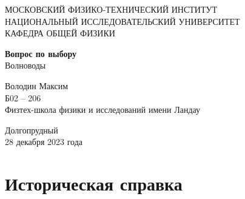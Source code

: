 \documentclass[a4paper, 14pt]{article}
\begin{document}
    \begin{titlepage}
        \begin{center}
        {\large МОСКОВСКИЙ ФИЗИКО-ТЕХНИЧЕСКИЙ ИНСТИТУТ \\ \vspace{5mm}
        НАЦИОНАЛЬНЫЙ ИССЛЕДОВАТЕЛЬСКИЙ УНИВЕРСИТЕТ \\ \vspace{5mm}
        КАФЕДРА ОБЩЕЙ ФИЗИКИ}
        \end{center}
        
        \begin{center}
        {\large}
        \end{center}
        
        \vspace{5cm}
        
        {\huge
            \begin{center}
            {\textbf{Вопрос по выбору}}
                \\
                Волноводы
            \end{center}
        }
        
        \vspace{2cm}
        
        \begin{flushright}
        {
            Володин Максим \\
            \vspace{2mm}
            Б02 -- 206 \\
            \vspace{2mm}
            Физтех-школа физики и исследований имени Ландау
        }
        \end{flushright}
        
        \tableofcontents \vspace{2.5cm}
        
        \begin{center}
            Долгопрудный \\
            28 декабря 2023 года
        \end{center}
    
    \end{titlepage}
    
    \section*{Историческая справка} 
    
\end{document}
